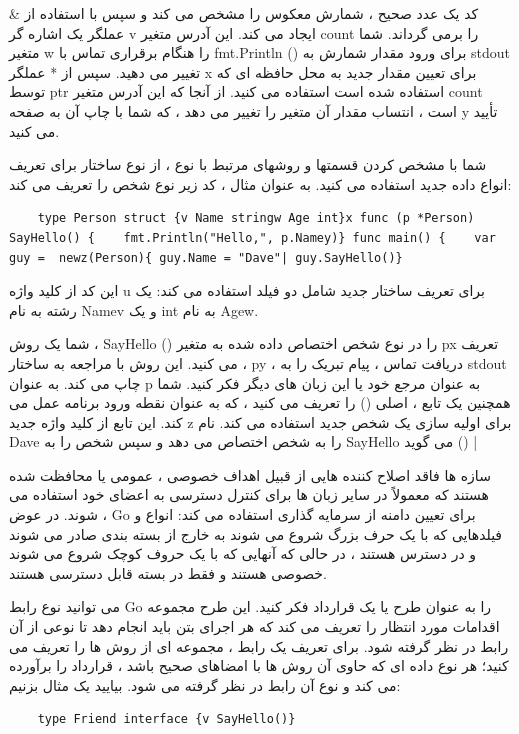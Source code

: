 \documentclass[12pt]{book}
\begin{document}
کد یک عدد صحیح ، شمارش معکوس را مشخص می کند و سپس با استفاده از \& عملگر یک اشاره گر v ایجاد می کند. این آدرس متغیر count را برمی گرداند. شما متغیر w را هنگام برقراری تماس با fmt.Println () برای ورود مقدار شمارش به stdout تغییر می دهید. سپس از * عملگر x برای تعیین مقدار جدید به محل حافظه ای که توسط ptr استفاده شده است استفاده می کنید. از آنجا که این آدرس متغیر count است ، انتساب مقدار آن متغیر را تغییر می دهد ، که شما با چاپ آن به صفحه y تأیید می کنید.

شما با مشخص کردن قسمتها و روشهای مرتبط با نوع ، از نوع ساختار برای تعریف انواع داده جدید استفاده می کنید. به عنوان مثال ، کد زیر نوع شخص را تعریف می کند:
\begin{latin}
	\begin{lstlisting}
	type Person struct {v Name stringw Age int}x func (p *Person) SayHello() {    fmt.Println("Hello,", p.Namey)} func main() {    var guy =  newz(Person){ guy.Name = "Dave"| guy.SayHello()}
	\end{lstlisting}
\end{latin}

این کد از کلید واژه u برای تعریف ساختار جدید شامل دو فیلد استفاده می کند: یک رشته به نام Namev و یک int به نام Agew.

شما یک روش ، SayHello () را در نوع شخص اختصاص داده شده به متغیر px تعریف می کنید. این روش با مراجعه به ساختار ، py ، دریافت تماس ، پیام تبریک را به stdout چاپ می کند. به عنوان p به عنوان مرجع خود یا این زبان های دیگر فکر کنید. شما همچنین یک تابع ، اصلی () را تعریف می کنید ، که به عنوان نقطه ورود برنامه عمل می کند. این تابع از کلید واژه جدید z برای اولیه سازی یک شخص جدید استفاده می کند. نام Dave را به شخص اختصاص می دهد و سپس شخص را به SayHello می گوید () |

سازه ها فاقد اصلاح کننده هایی از قبیل اهداف خصوصی ، عمومی یا محافظت شده هستند که معمولاً در سایر زبان ها برای کنترل دسترسی به اعضای خود استفاده می شوند. در عوض ، Go برای تعیین دامنه از سرمایه گذاری استفاده می کند: انواع و فیلدهایی که با یک حرف بزرگ شروع می شوند به خارج از بسته بندی صادر می شوند و در دسترس هستند ، در حالی که آنهایی که با یک حروف کوچک شروع می شوند خصوصی هستند و فقط در بسته قابل دسترسی هستند.

می توانید نوع رابط Go را به عنوان طرح یا یک قرارداد فکر کنید. این طرح مجموعه اقدامات مورد انتظار را تعریف می کند که هر اجرای بتن باید انجام دهد تا نوعی از آن رابط در نظر گرفته شود. برای تعریف یک رابط ، مجموعه ای از روش ها را تعریف می کنید؛ هر نوع داده ای که حاوی آن روش ها با امضاهای صحیح باشد ، قرارداد را برآورده می کند و نوع آن رابط در نظر گرفته می شود. بیایید یک مثال بزنیم:
\begin{latin}
	\begin{lstlisting}
	type Friend interface {v SayHello()}
	\end{lstlisting}
\end{latin}
\end{document}
